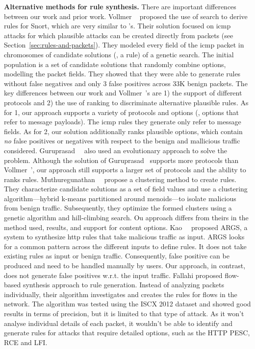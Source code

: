 \documentclass[conference]{IEEEtran}
\begin{document}
\noindent
\textbf{Alternative methods for rule synthesis.} There are important
differences between our work and prior work. Vollmer
\etal{}~\cite{vollmer-etal-cics2011} proposed the use of search to
derive rules for Snort, which are very similar to \suri's.  Their
solution focused on icmp attacks for which plausible attacks can be
created directly from packets (see
Section~\ref{sec:rules-and-packets}). They modeled every field of the
icmp packet in chromosomes of candidate solutions (\ie{}, a rule) of a
genetic search. The initial population is a set of candidate solutions
that randomly combine options, modelling the packet fields. They
showed that they were able to generate rules without false negatives
and only 3 false positives across 33K benign packets. The key
differences between our work and Vollmer~\etal{}'s are 1) the support
of different protocols and 2) the use of ranking to discriminate
alternative plausible rules. As for 1, our approach supports a variety
of protocols and options (\eg{}, options that refer to message
payloads). The icmp rules they generate only refer to message fields.
 As for 2, our solution additionally ranks
plausible options, which contain \emph{no} false positives or
negatives with respect to the benign and mallicious traffic
considered. Guruprasad~\etal{}~\cite{guruprasad} also used an
evolutionary approach to solve the problem. Although the solution of
Guruprasad~\etal{} supports more protocols than Vollmer~\etal{}', our
approach still supports a larger set of protocols and the ability to
ranks rules. Muthuregunathan~\etal{}~\cite{muthuregunathan-etal2009}
propose a clustering method to create rules. They characterize
candidate solutions as a set of field values and use a clustering
algorithm---hybrid k-means partitioned around menoids---to isolate
malicious from benign traffic. Subsequently, they optimize the formed
clusters using a genetic algorithm and hill-climbing search. Ou
approach differs from theirs in the method used, results, and support
for content options. Kao~\etal~\cite{Kao2015AutomaticNR} proposed
ARGS, a system to synthesize http rules that take malicious traffic as
input. ARGS looks for a common pattern across the different inputs to
define rules. It does not take existing rules as input or benign
traffic. Consequently, false positive can be produced and need to be
handled manually by users. Our approach, in contrast, does not
generate false positives w.r.t. the input traffic. Fallahi
\etal{}\cite{fallahi} proposed flow-based synthesis approach to rule
generation. Instead of analyzing packets individually, their algorithm
investigates and creates the rules for flows in the network. The
algorithm was tested using the ISCX 2012 dataset and showed good
results in terms of precision, but it is limited to that type of
attack. As it won't analyse individual details of each packet, it
wouldn't be able to identify and generate rules for attacks that
require detailed options, such as the HTTP PESC, RCE and LFI.
\end{document}
